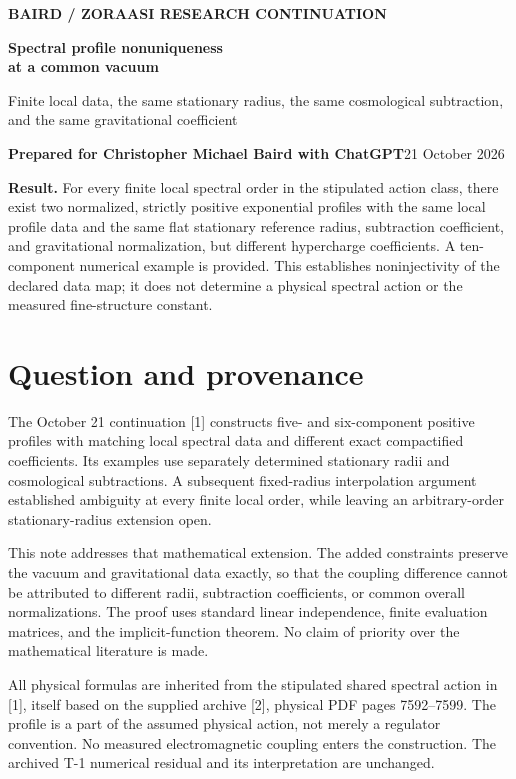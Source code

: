 \documentclass[11pt,letterpaper]{article}
\begin{document}
\thispagestyle{plain}
{\small\color{teal}\textbf{BAIRD / ZORAASI RESEARCH CONTINUATION}}

{\LARGE\bfseries\color{navy} Spectral profile nonuniqueness\\[3pt] at a common vacuum}

{\large Finite local data, the same stationary radius, the same cosmological subtraction, and the same gravitational coefficient}

\textbf{Prepared for Christopher Michael Baird with ChatGPT}\hfill 21 October 2026

\colorbox{pale}{\parbox{\dimexpr\linewidth-2\fboxsep\relax}{\textbf{Result.} For every finite local spectral order in the stipulated action class, there exist two normalized, strictly positive exponential profiles with the same local profile data and the same flat stationary reference radius, subtraction coefficient, and gravitational normalization, but different hypercharge coefficients. A ten-component numerical example is provided. This establishes noninjectivity of the declared data map; it does not determine a physical spectral action or the measured fine-structure constant.}}

\section{Question and provenance}

The October 21 continuation [1] constructs five- and six-component positive profiles with matching local spectral data and different exact compactified coefficients. Its examples use separately determined stationary radii and cosmological subtractions. A subsequent fixed-radius interpolation argument established ambiguity at every finite local order, while leaving an arbitrary-order stationary-radius extension open.

This note addresses that mathematical extension. The added constraints preserve the vacuum and gravitational data exactly, so that the coupling difference cannot be attributed to different radii, subtraction coefficients, or common overall normalizations. The proof uses standard linear independence, finite evaluation matrices, and the implicit-function theorem. No claim of priority over the mathematical literature is made.

All physical formulas are inherited from the stipulated shared spectral action in [1], itself based on the supplied archive [2], physical PDF pages 7592--7599. The profile is a part of the assumed physical action, not merely a regulator convention. No measured electromagnetic coupling enters the construction. The archived T-1 numerical residual and its interpretation are unchanged.
\end{document}

